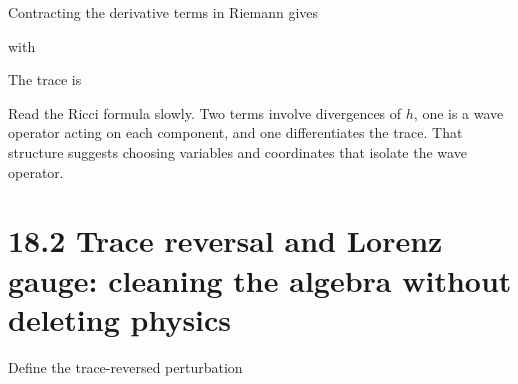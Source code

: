 \documentclass[
  11pt,
  letterpaper,
  oneside,
  openany]{scrbook}
\begin{document}
Contracting the derivative terms in Riemann gives

\begin{center}
\begingroup
{}
\ifdim\wd\grmathbox>\linewidth
\resizebox{\linewidth}{!}{\usebox{\grmathbox}}
\else\usebox{\grmathbox}\fi
\endgroup
\end{center}

with

\begin{center}
\begingroup
{}
\ifdim\wd\grmathbox>\linewidth
\resizebox{\linewidth}{!}{\usebox{\grmathbox}}
\else\usebox{\grmathbox}\fi
\endgroup
\end{center}

The trace is

\begin{center}
\begingroup
{}
\ifdim\wd\grmathbox>\linewidth
\resizebox{\linewidth}{!}{\usebox{\grmathbox}}
\else\usebox{\grmathbox}\fi
\endgroup
\end{center}

Read the Ricci formula slowly. Two terms involve divergences of \(h\),
one is a wave operator acting on each component, and one differentiates
the trace. That structure suggests choosing variables and coordinates
that isolate the wave operator.

\hypertarget{trace-reversal-and-lorenz-gauge-cleaning-the-algebra-without-deleting-physics}{%
\section{18.2 Trace reversal and Lorenz gauge: cleaning the algebra
without deleting
physics}\label{trace-reversal-and-lorenz-gauge-cleaning-the-algebra-without-deleting-physics}}

Define the trace-reversed perturbation

\begin{center}
\begingroup
{}
\ifdim\wd\grmathbox>\linewidth
\resizebox{\linewidth}{!}{\usebox{\grmathbox}}
\else\usebox{\grmathbox}\fi
\endgroup
\end{center}
\end{document}
